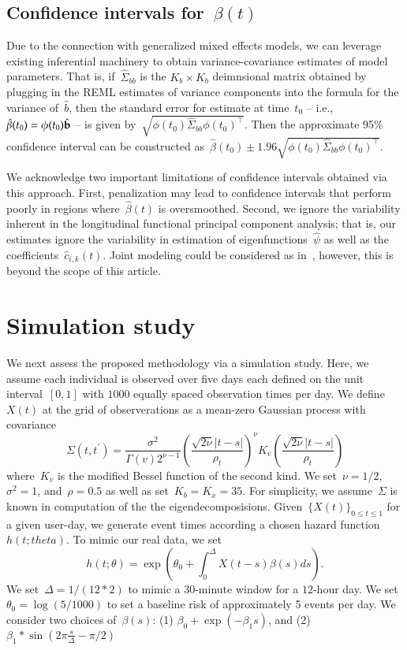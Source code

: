 \documentclass[11pt]{amsart}
\begin{document}
\subsection{Confidence intervals for~$\beta(t)$}

Due to the connection with generalized mixed effects models, we can leverage existing inferential machinery to obtain variance-covariance estimates of model parameters. That is, if~$\hat \Sigma_{bb}$ is the $K_b \times K_b$ deimnsional matrix obtained by plugging in the REML estimates of variance components into the formula for the variance of~$\hat b$, then the standard error for estimate at time~$t_0$ -- i.e., ~$\hat \beta (t_0) = \phi(t_0) \hat {\bf b}$ -- is given by~$\sqrt{ \phi (t_0 ) \hat \Sigma_{bb} \phi(t_0)^\top}$.  Then the approximate 95\% confidence interval can be constructed as~$\hat \beta (t_0) \pm 1.96 \sqrt{\phi (t_0) \hat \Sigma_{bb} \phi(t_0)^\top}$.

We acknowledge two important limitations of confidence intervals obtained via this approach. First, penalization may lead to confidence intervals that perform poorly in regions where~$\hat \beta(t)$ is oversmoothed. Second, we ignore the variability inherent in the longitudinal functional principal component analysis; that is, our estimates ignore the variability in estimation of eigenfunctions~$\hat \psi$ as well as the coefficients~$\hat c_{i,k}(t)$. Joint modeling could be considered as in~\cite{Crainiceanu2010}, however, this is beyond the scope of this article.

\section{Simulation study} \label{section:simstudy}


We next assess the proposed methodology via a simulation study. Here, we assume each individual is observed over five days each defined on the unit interval~$[0,1]$ with $1000$ equally spaced observation times per day. We define~$X(t)$ at the grid of observerations as a mean-zero Gaussian process with covariance
\[
  \Sigma (t, t^\prime) =
  \frac{\sigma^2}{\Gamma (v) 2^{\nu-1}}
  \left( \frac{\sqrt{2 \nu} |t-s|}{\rho_t} \right)^{\nu}
  K_v \left( \frac{\sqrt{2 \nu} |t-s|}{\rho_t} \right)
\]
where~$K_v$ is the modified Bessel function of the second kind.  We set~$\nu = 1/2$, $\sigma^2 = 1$, and~$\rho = 0.5$ as well as set~$K_b = K_x = 35$.  For simplicity, we assume~$\Sigma$ is known in computation of the the eigendecomposisions. Given~$\{ X(t) \}_{0 \leq t \leq 1}$ for a given user-day, we generate event times according a chosen hazard function~$h (t; theta)$.  To mimic our real data, we set
\[
h(t; \theta) = \exp \left( \theta_0 + \int_{0}^{\Delta} X(t-s) \beta(s) ds \right).
\]
We set~$\Delta = 1/(12*2)$ to mimic a $30$-minute window for a $12$-hour day.  We set~$\theta_0 = \log(5/1000)$ to set a baseline risk of approximately 5 events per day. We consider two choices of~$\beta(s)$: (1) $\beta_0 + \exp(- \beta_1 s) $, and (2) $\beta_1  * \sin \left( 2 \pi \frac{s}{\Delta} - \pi/2 \right)$
\end{document}
